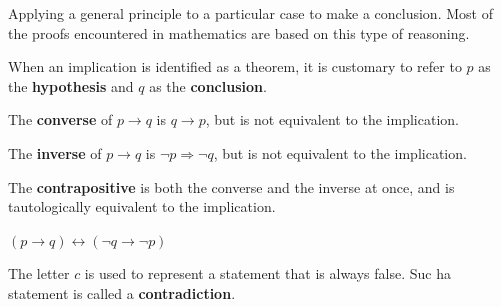 \documentclass[12pt]{article}
\begin{document}
\begin{definition}
  Applying a general principle to a particular case to make a conclusion.
  Most of the proofs encountered in mathematics are based on this type of
  reasoning.
\end{definition}

\begin{definition}
  When an implication is identified as a theorem, it is customary to refer to
  $p$ as the \textbf{hypothesis} and $q$ as the \textbf{conclusion}.
\end{definition}

\begin{definition}[Contrapositive]
  The \textbf{converse} of $p \rightarrow q$ is $q \rightarrow p$, but is not
  equivalent to the implication.

  The \textbf{inverse} of $p \rightarrow q$ is $\neg p \Rightarrow \neg q$, but
  is not equivalent to the implication.

  The \textbf{contrapositive} is both the converse and the inverse at once, and
  is tautologically equivalent to the implication.
  \begin{center}
    $(p \rightarrow q) \leftrightarrow (\neg q \rightarrow \neg p)$
  \end{center}
\end{definition}

\begin{definition}[Contradiction]
  The letter $c$ is used to represent a statement that is always false. Suc
  ha statement is called a \textbf{contradiction}.
\end{definition}
\end{document}
